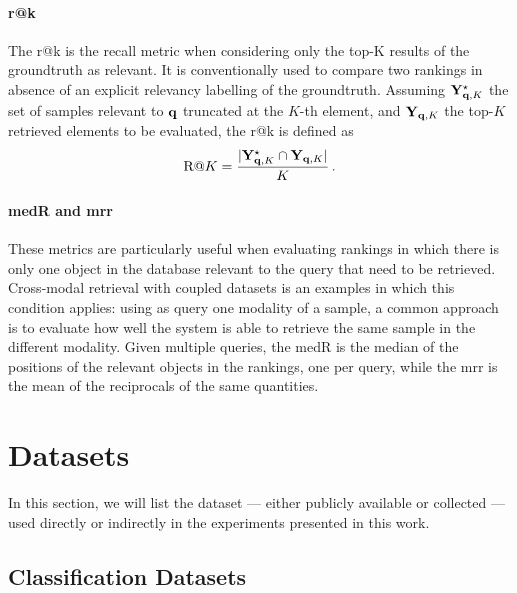 
\paragraph{\acrlong{r@k}}
The \acrfull{r@k} is the recall metric when considering only the top-K results of the groundtruth as relevant.
It is conventionally used to compare two rankings in absence of an explicit relevancy labelling of the groundtruth.
Assuming $\mathbf{Y}^{\star}_{\mathbf{q}, K}$ the set of samples relevant to $\mathbf{q}$ truncated at the $K$-th element, and $\mathbf{Y}_{\mathbf{q},K}$ the top-$K$ retrieved elements to be evaluated, the \gls{r@k} is defined as
\begin{equation} \label{eq:back:r@k}
    \text{R}@K = \frac{|\mathbf{Y}^{\star}_{\mathbf{q}, K} \cap \mathbf{Y}_{\mathbf{q},K}|}{K} \,.
\end{equation}

\paragraph{\acrlong{medR} and \acrlong{mrr}}
These metrics are particularly useful when evaluating rankings in which there is only one object in the database relevant to the query that need to be retrieved.
Cross-modal retrieval with coupled datasets is an examples in which this condition applies: using as query one modality of a sample, a common approach is to evaluate how well the system is able to retrieve the same sample in the different modality.
Given multiple queries, the \acrfull{medR} is the median of the positions of the relevant objects in the rankings, one per query,
while the \acrfull{mrr} is the mean of the reciprocals of the same quantities.


\section{Datasets}
\label{sec:back:datasets}
In this section, we will list the dataset --- either publicly available or collected --- used directly or indirectly in the experiments presented in this work.

\subsection{Classification Datasets}

